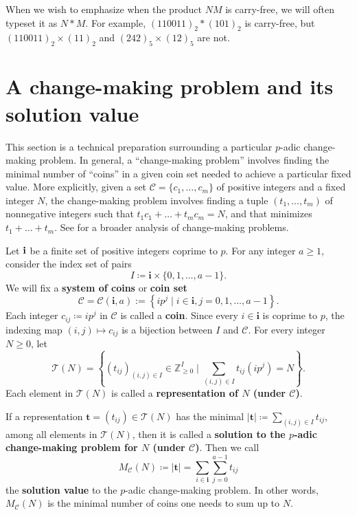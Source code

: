 \documentclass{amsart}
\numberwithin{equation}{section}
\newcommand{\Z}{\mathbb{Z}}
\newcommand{\cT}{\mathcal{T}}
\newcommand{\cC}{\mathcal{C}}
\newcommand{\bi}{\mathbf{i}}
\newcommand{\bt}{\mathbf{t}}
\theoremstyle{plain}
\theoremstyle{definition}
\begin{document}
When we wish to emphasize when the product $NM$ is carry-free,
we will often typeset it as $N*M$.
For example,
$(110011)_2 * (101)_2$ is carry-free, but $(110011)_2\times (11)_2$
and $(242)_5\times (12)_5$ are not.

\section{A change-making problem and its 
solution value}
\label{S:change-making}
This section is a technical preparation
surrounding a particular
$p$-adic change-making problem.
In general, a ``change-making problem'' involves
finding the minimal number of ``coins'' in a given coin set 
needed to achieve
a particular fixed value.
More explicitly, given a set $\cC = \{c_1, \dots, c_m\}$ of positive integers
and a fixed integer $N$, the change-making problem involves finding
a tuple $(t_1, \dots, t_m)$ of nonnegative integers such that
$t_1 c_1 + \dots + t_m c_m = N$, and that minimizes $t_1 + \dots + t_m$.
See \cite{CLRS} for a broader analysis of change-making problems.

Let $\bf{i}$ be a finite set of positive integers coprime to $p$.
For any integer $a\ge 1$,  consider the index set of pairs
$$
    I \coloneqq \bi \times \{0, 1, \dots, a-1\}.
$$
We will fix a \textbf{system of coins} or \textbf{coin set}
\begin{equation}\label{E:coin_set}
\cC = \cC(\bi,a):=\left\{ip^j\mid i\in \bi, j=0,1,\ldots, a-1\right\}.
\end{equation}
Each integer $c_{ij} \coloneqq ip^j$ in $\mathcal{C}$ is called a \textbf{coin}.
Since every $i\in \bi$ is coprime to $p$, the indexing map $(i,j) \mapsto c_{ij}$
is a bijection between $I$ and $\cC$.
For every integer $N \ge 0$, let
\begin{equation}
\label{E:I(N)}
    \cT(N) = \left\{(t_{ij})_{(i,j)\in I} \in \Z_{\ge 0}^{I}
    \mid \sum_{(i,j)\in I} t_{ij}(ip^j) = N\right\}.
\end{equation}
Each element in $\cT(N)$ is called a \textbf{representation of $N$ (under $\cC$)}.

If a representation $\bt = (t_{ij})\in \cT(N)$ has the minimal $|\bt|\coloneqq\sum_{(i,j)\in I}t_{ij}$, among all elements in $\cT(N)$, then it is 
called a \textbf{solution to the $p$-adic change-making problem for $N$ (under
$\cC$)}.
Then we call 
$$M_{\cC}(N) \coloneqq |\mathbf{t}|=\sum_{i\in\bi}\sum_{j=0}^{a-1} t_{ij}$$
the \textbf{solution value} to the $p$-adic change-making problem. 
In other words, $M_\cC(N)$ is the minimal number of 
coins one needs to sum up to $N$.
\end{document}
